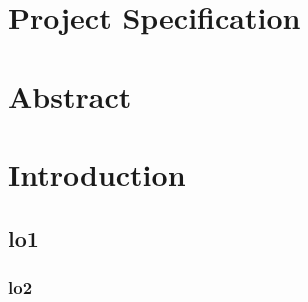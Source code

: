 \documentclass[11pt, letterpaper]{article}            %
\newcommand{\footrulecolor}[1]{\patchcmd{\footrule}{\hrule}{\color{#1}\hrule}{}{}} %
\begin{document}
\section*{Project Specification}
\lipsum[1]
\newpage

\section*{Abstract}
\lipsum[1]
\newpage

\tableofcontents
\newpage

\fancyfoot{} %
\renewcommand{\footrulewidth}{0.4pt} %
\footrulecolor{linec}

\section{Introduction}
\lipsum[1-10]
\subsection{lo1}
\lipsum[1-10]
\subsubsection{lo2}
\lipsum[1-10]
\end{document}
